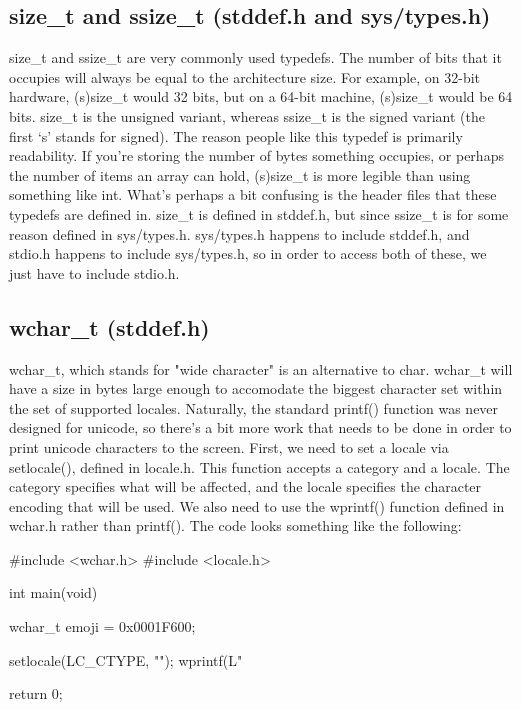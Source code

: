 \documentclass{article}
\begin{document}
\subsection{size\_t and ssize\_t (stddef.h and sys/types.h)}

size\_t and ssize\_t are very commonly used typedefs. The number of bits that it occupies will always be equal
to the architecture size. For example, on 32-bit hardware, (s)size\_t would 32 bits, but on a 64-bit machine,
(s)size\_t would be 64 bits. size\_t is the unsigned variant, whereas ssize\_t is the signed variant (the first
‘s’ stands for signed). The reason people like this typedef is primarily readability. If you’re storing the
number of bytes something occupies, or perhaps the number of items an array can hold, (s)size\_t is more
legible than using something like int. What’s perhaps a bit confusing is the header files that these typedefs
are defined in. size\_t is defined in stddef.h, but since ssize\_t is for some reason defined in sys/types.h.
sys/types.h happens to include stddef.h, and stdio.h happens to include sys/types.h, so in order to access both
of these, we just have to include stdio.h.

\subsection{wchar\_t (stddef.h)}

wchar\_t, which stands for "wide character" is an alternative to char. wchar\_t will have a size in bytes
large enough to accomodate the biggest character set within the set of supported locales. Naturally, the
standard printf() function was never designed for unicode, so there’s a bit more work that needs to be done
in order to print unicode characters to the screen. First, we need to set a locale via setlocale(), defined in
locale.h. This function accepts a category and a locale. The category specifies what will be affected, and the
locale specifies the character encoding that will be used. We also need to use the wprintf() function defined
in wchar.h rather than printf(). The code looks something like the following:

\begin{clst}
#include <wchar.h>
#include <locale.h>

int main(void) {
    wchar_t emoji = 0x0001F600;

    setlocale(LC_CTYPE, "");
    wprintf(L"%

    return 0;
}
\end{clst}
\end{document}
